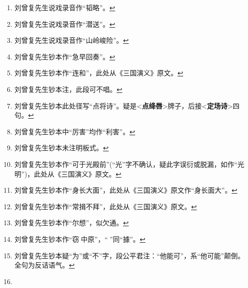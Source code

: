 \begin{enumerate}
\item
  \leavevmode\hypertarget{fn259}{}%
  刘曾复先生说戏录音作``韬略''。\protect\hyperlink{fnref259}{↩}
\item
  \leavevmode\hypertarget{fn260}{}%
  刘曾复先生说戏录音作``潜送''。\protect\hyperlink{fnref260}{↩}
\item
  \leavevmode\hypertarget{fn261}{}%
  刘曾复先生说戏录音作``山岭峻险''。\protect\hyperlink{fnref261}{↩}
\item
  \leavevmode\hypertarget{fn262}{}%
  刘曾复先生钞本作``急早回奏''。\protect\hyperlink{fnref262}{↩}
\item
  \leavevmode\hypertarget{fn263}{}%
  刘曾复先生钞本作``连和''，此处从《三国演义》原文。\protect\hyperlink{fnref263}{↩}
\item
  \leavevmode\hypertarget{fn264}{}%
  刘曾复先生钞本注，此段可不唱。\protect\hyperlink{fnref264}{↩}
\item
  \leavevmode\hypertarget{fn265}{}%
  刘曾复先生钞本此处径写``点将诗''。疑是\textless{}\textbf{点绛唇}\textgreater{}牌子，后接\textless{}\textbf{定场诗}\textgreater{}四句。\protect\hyperlink{fnref265}{↩}
\item
  \leavevmode\hypertarget{fn266}{}%
  刘曾复先生钞本中``厉害''均作``利害''。\protect\hyperlink{fnref266}{↩}
\item
  \leavevmode\hypertarget{fn267}{}%
  刘曾复先生钞本未注明板式。\protect\hyperlink{fnref267}{↩}
\item
  \leavevmode\hypertarget{fn268}{}%
  刘曾复先生钞本作``可于光殿前''(``光''字不确认，疑此字误衍或脱漏，如作``光明'')，此处从《三国演义》原文。\protect\hyperlink{fnref268}{↩}
\item
  \leavevmode\hypertarget{fn269}{}%
  刘曾复先生钞本作``身长大面''，此处从《三国演义》原文作``身长面大''。\protect\hyperlink{fnref269}{↩}
\item
  \leavevmode\hypertarget{fn270}{}%
  刘曾复先生钞本作``常揖不拜''，此处从《三国演义》原文。\protect\hyperlink{fnref270}{↩}
\item
  \leavevmode\hypertarget{fn271}{}%
  刘曾复先生钞本作``尔想''，似欠通。\protect\hyperlink{fnref271}{↩}
\item
  \leavevmode\hypertarget{fn272}{}%
  刘曾复先生钞本作``窃𢫑中原''，``𢫑''同``據''。\protect\hyperlink{fnref272}{↩}
\item
  \leavevmode\hypertarget{fn273}{}%
  刘曾复先生钞本疑``为''或``不''字，段公平君注：``他能可''，系``他可能''颠倒。全句为反诘语气。\protect\hyperlink{fnref273}{↩}
\item
  \leavevmode\hypertarget{fn274}{}%

\end{enumerate}
